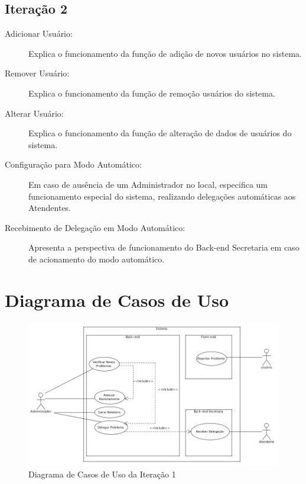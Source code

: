 \documentclass[brazil,times]{abnt}
\begin{document}
\subsection{Iteração 2}
\begin{description}
  \item[Adicionar Usuário:] Explica o funcionamento da função de adição de novos
  usuários no sistema.
  \item[Remover Usuário:] Explica o funcionamento da função de remoção usuários
  do sistema.
  \item[Alterar Usuário:] Explica o funcionamento da função de alteração de
  dados de usuários do sistema.
  \item[Configuração para Modo Automático:] Em caso de ausência de um
  Administrador no local, especifica um funcionamento especial do sistema, realizando
  delegações automáticas aos Atendentes.
  \item[Recebimento de Delegação em Modo Automático:] Apresenta a perspectiva de
  funcionamento do Back-end Secretaria em caso de acionamento do modo
  automático.
\end{description}

\section{Diagrama de Casos de Uso}
\begin{figure}[htp]
\begin{center}
  \includegraphics[width=\linewidth]{diagramas/diagramaDeUso.png}
  \caption[Diagrama de Casos de Uso da Iteração 1]{Diagrama de Casos de Uso da Iteração 1}
  \label{diagrama-casos-uso}
\end{center}
\end{figure}
\end{document}
